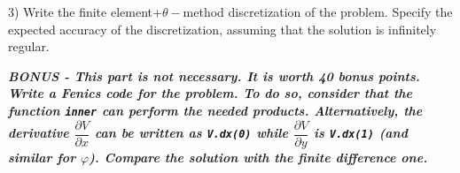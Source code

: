 \documentclass{article}
\newcommand{\tmem}[1]{{\em #1\/}}
\newcommand{\tmstrong}[1]{\textbf{#1}}
\newcommand{\tmtt}[1]{\texttt{#1}}
\begin{document}
3) Write the finite element+$\theta -$method discretization of the problem.
Specify the expected accuracy of the discretization, assuming that the
solution is infinitely regular.

{\tmstrong{{\tmem{BONUS - This part is not necessary. It is worth 40 bonus
points.
Write a Fenics code for the problem. To do so, consider that the function
{\tmtt{inner}} can perform the needed products. Alternatively, the derivative
$\dfrac{\partial V}{\partial x}$ can be written as {\tmtt{V.dx(0)}} while
$\dfrac{\partial V}{\partial y}$ is {\tmtt{V.dx(1)}} (and similar for
$\varphi$). Compare the solution with the finite difference one.}}}}
\end{document}
